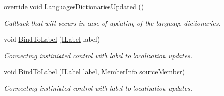 \begin{DoxyCompactItemize}
override void \mbox{\hyperlink{class_wpf_handler_1_1_u_i_1_1_auto_layout_1_1_configuration_1_1_content_attribute_a498818bc121b7f408af302eb4085056a}{Languages\+Dictionaries\+Updated}} ()
\begin{DoxyCompactList}\small\item\em Callback that will occurs in case of updating of the language dictionaries. \end{DoxyCompactList}\item 
void \mbox{\hyperlink{class_wpf_handler_1_1_u_i_1_1_auto_layout_1_1_configuration_1_1_content_attribute_a0d0f48fc255493eec2f341b9b90d5eee}{Bind\+To\+Label}} (\mbox{\hyperlink{interface_wpf_handler_1_1_u_i_1_1_controls_1_1_i_label}{I\+Label}} label)
\begin{DoxyCompactList}\small\item\em Connecting instiniated control with label to localization updates. \end{DoxyCompactList}\item 
void \mbox{\hyperlink{class_wpf_handler_1_1_u_i_1_1_auto_layout_1_1_configuration_1_1_content_attribute_aced8f451c4ff60a54694d64581432a36}{Bind\+To\+Label}} (\mbox{\hyperlink{interface_wpf_handler_1_1_u_i_1_1_controls_1_1_i_label}{I\+Label}} label, Member\+Info source\+Member)
\begin{DoxyCompactList}\small\item\em Connecting instiniated control with label to localization updates. \end{DoxyCompactList}\end{DoxyCompactItemize}
